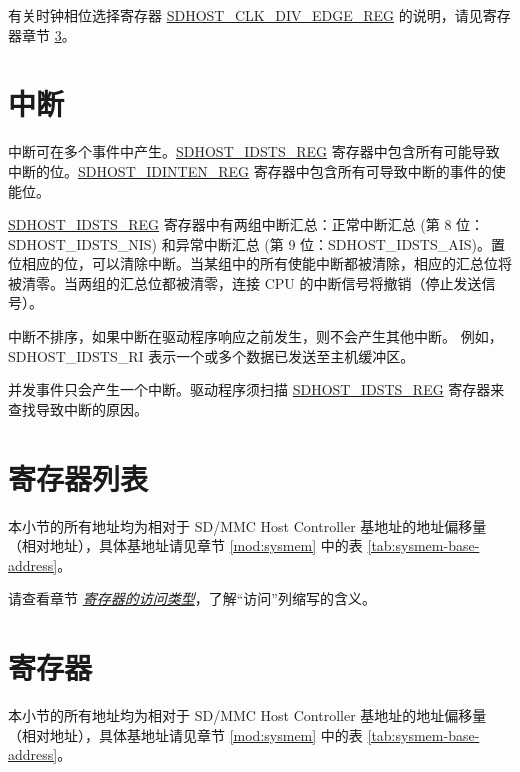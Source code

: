 \documentclass[main\_\_CN.tex]{subfiles}
\begin{document}
有关时钟相位选择寄存器 \hyperref[regdesc:CLKEDGESEL]{SDHOST\_CLK\_DIV\_EDGE\_REG} 的说明，请见寄存器章节 \ref{sec:sdhost-reg}。



\section{中断}
中断可在多个事件中产生。\hyperref[regdesc:IDSTSREG]{SDHOST\_IDSTS\_REG} 寄存器中包含所有可能导致中断的位。\hyperref[regdesc:IDINTENREG]{SDHOST\_IDINTEN\_REG} 寄存器中包含所有可导致中断的事件的使能位。

\hyperref[regdesc:IDSTSREG]{SDHOST\_IDSTS\_REG} 寄存器中有两组中断汇总：正常中断汇总 (第 8 位：SDHOST\_IDSTS\_NIS) 和异常中断汇总 (第 9 位：SDHOST\_IDSTS\_AIS)。置位相应的位，可以清除中断。当某组中的所有使能中断都被清除，相应的汇总位将被清零。当两组的汇总位都被清零，连接 CPU 的中断信号将撤销（停止发送信号）。

中断不排序，如果中断在驱动程序响应之前发生，则不会产生其他中断。 例如，SDHOST\_IDSTS\_RI 表示一个或多个数据已发送至主机缓冲区。

并发事件只会产生一个中断。驱动程序须扫描 \hyperref[regdesc:IDSTSREG]{SDHOST\_IDSTS\_REG} 寄存器来查找导致中断的原因。






\clearpage
\hypertarget{sdhost-reg-summ}{}
\section{寄存器列表}
\label{sec:sdhost-reg-summ}

本小节的所有地址均为相对于 SD/MMC Host Controller 基地址的地址偏移量（相对地址），具体基地址请见章节 \ref{mod:sysmem} \textit{} 中的表 \ref{tab:sysmem-base-address}。

请查看章节 \hyperref[glossary-access-types]{\textit{寄存器的访问类型}}，了解“访问”列缩写的含义。






\clearpage
\section{寄存器}
\label{sec:sdhost-reg}

本小节的所有地址均为相对于 SD/MMC Host Controller 基地址的地址偏移量（相对地址），具体基地址请见章节 \ref{mod:sysmem} \textit{} 中的表 \ref{tab:sysmem-base-address}。


\end{document}
